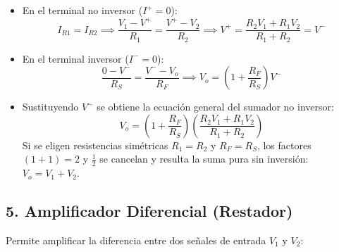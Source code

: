 \begin{center}
\end{center}

\begin{itemize}[leftmargin=*]
    \item En el terminal no inversor ($I^+ = 0$):
    \begin{equation}
        I_{R1} = I_{R2} \implies \frac{V_1 - V^+}{R_1} = \frac{V^+ - V_2}{R_2} \implies V^+ = \frac{R_2 V_1 + R_1 V_2}{R_1 + R_2} = V^-
    \end{equation}
    \item En el terminal inversor ($I^- = 0$):
    \begin{equation}
        \frac{0 - V^-}{R_S} = \frac{V^- - V_o}{R_F} \implies V_o = \left(1 + \frac{R_F}{R_S}\right) V^-
    \end{equation}
    \item Sustituyendo $V^-$ se obtiene la ecuación general del sumador no inversor:
    \begin{equation}
        \boxed{V_o = \left(1 + \frac{R_F}{R_S}\right) \left(\frac{R_2 V_1 + R_1 V_2}{R_1 + R_2}\right)}
    \end{equation}
    Si se eligen resistencias simétricas $R_1 = R_2$ y $R_F = R_S$, los factores $\left(1 + 1\right) = 2$ y $\frac{1}{2}$ se cancelan y resulta la suma pura sin inversión: $V_o = V_1 + V_2$.
\end{itemize}

\subsection{5. Amplificador Diferencial (Restador)}

Permite amplificar la diferencia entre dos señales de entrada $V_1$ y $V_2$:


